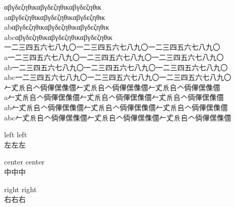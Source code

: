 \documentclass{ujarticle}
\begin{document}
αβγδεζηθικαβγδεζηθικαβγδεζηθικ\\
aαβγδεζηθικαβγδεζηθικαβγδεζηθικ\\
abαβγδεζηθικαβγδεζηθικαβγδεζηθικ\\
abcαβγδεζηθικαβγδεζηθικαβγδεζηθικ\\

一二三四五六七八九〇一二三四五六七八九〇一二三四五六七八九〇\\
a一二三四五六七八九〇一二三四五六七八九〇一二三四五六七八九〇\\
ab一二三四五六七八九〇一二三四五六七八九〇一二三四五六七八九〇\\
abc一二三四五六七八九〇一二三四五六七八九〇一二三四五六七八九〇\\

𠂉𠀋𠂢𠂤𠆢𠈓𠌫𠎁𠍱𠏹𠂉𠀋𠂢𠂤𠆢𠈓𠌫𠎁𠍱𠏹𠂉𠀋𠂢𠂤𠆢𠈓𠌫𠎁𠍱𠏹\\
a𠂉𠀋𠂢𠂤𠆢𠈓𠌫𠎁𠍱𠏹𠂉𠀋𠂢𠂤𠆢𠈓𠌫𠎁𠍱𠏹𠂉𠀋𠂢𠂤𠆢𠈓𠌫𠎁𠍱𠏹\\
ab𠂉𠀋𠂢𠂤𠆢𠈓𠌫𠎁𠍱𠏹𠂉𠀋𠂢𠂤𠆢𠈓𠌫𠎁𠍱𠏹𠂉𠀋𠂢𠂤𠆢𠈓𠌫𠎁𠍱𠏹\\
abc𠂉𠀋𠂢𠂤𠆢𠈓𠌫𠎁𠍱𠏹𠂉𠀋𠂢𠂤𠆢𠈓𠌫𠎁𠍱𠏹𠂉𠀋𠂢𠂤𠆢𠈓𠌫𠎁𠍱𠏹\\

\begin{flushleft}
left left\\
左左左
\end{flushleft}

\begin{center}
center center\\
中中中
\end{center}

\begin{flushright}
right right\\
右右右
\end{flushright}
\end{document}
